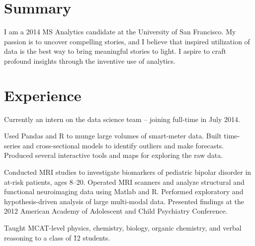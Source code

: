 \documentclass[]{deedy-resume-openfont}
\begin{document}
\begin{minipage}[t]{0.66\textwidth} 


\section{Summary}
I am a 2014 MS Analytics candidate at the University of San Francisco. My passion is to uncover compelling stories, and I believe that inspired utilization of data is the best way to bring meaningful stories to light. I aspire to craft profound insights through the inventive use of analytics.
\sectionsep


\section{Experience}

\vspace{\topsep}
Currently an intern on the data science team -- joining full-time in July 2014.
\sectionsep

\vspace{\topsep} %
Used Pandas and R to munge large volumes of smart-meter data. Built time- series and cross-sectional models to identify outliers and make forecasts. Produced several interactive tools and maps for exploring the raw data.
\sectionsep

\vspace{\topsep} %
Conducted MRI studies to investigate biomarkers of pediatric bipolar disorder in at-risk patients, ages 8–20. Operated MRI scanners and analyze structural and functional neuroimaging data using Matlab and R. Performed exploratory and hypothesis-driven analysis of large multi-modal data. Presented findings at the 2012 American Academy of Adolescent and Child Psychiatry Conference.
\sectionsep

\vspace{\topsep} %
Taught MCAT-level physics, chemistry, biology, organic chemistry, and verbal reasoning to a class of \~12 students.
\sectionsep


\end{minipage}
\end{document}
